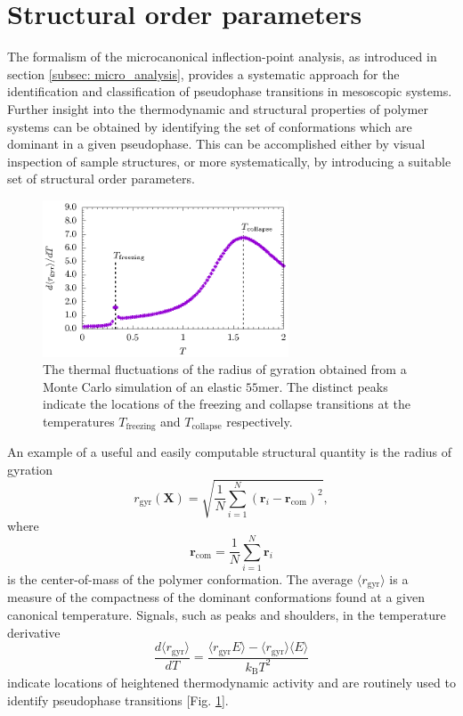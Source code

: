\documentclass[12pt]{report}
\begin{document}
\section{Structural order parameters}
\label{sec:orderParameters}
The formalism of the microcanonical inflection-point analysis, as introduced in section \ref{subsec: micro_analysis}, provides a systematic approach for the identification and classification of pseudophase transitions in mesoscopic systems. Further insight into the thermodynamic and structural properties of polymer systems can be obtained by identifying the set of conformations which are dominant in a given pseudophase. This can be accomplished either by visual inspection of sample structures, or more systematically, by introducing a suitable set of structural order parameters. 
%
\begin{figure}
\center
\includegraphics[width = 0.65\textwidth]{chapter4Figs/rogFluct.eps}
\caption{\label{fig:ROGFluct}%
The thermal fluctuations of the radius of gyration obtained from a Monte Carlo simulation of an elastic $55$mer. The distinct peaks indicate the locations of the freezing and collapse transitions at the temperatures $T_{\mathrm{freezing}}$ and $T_{\mathrm{collapse}}$ respectively.
}
\end{figure}
% 

An example of a useful and easily computable structural quantity is the radius of gyration
%
\begin{equation}
r_\mathrm{gyr}(\mathbf{X})=\sqrt{\frac{1}{N}\sum\limits_{i=1}^N
\left(\mathbf{r}_i-\mathbf{r}_\mathrm{com} \right)^2},
\end{equation}
%
where 
%
\begin{equation}
\mathbf{r}_\mathrm{com}=\frac{1}{N}\sum_{i=1}^N\mathbf{r}_i
\end{equation}
%
is the center-of-mass of the polymer conformation. The average $\langle r_{\mathrm{gyr}} \rangle$ is a measure of the compactness of the dominant conformations found at a given canonical temperature.
\newpage
\noindent
Signals, such as peaks and shoulders, in the temperature derivative 
%
\begin{equation}
\frac{d\langle r_{\mathrm{gyr}} \rangle}{dT} = \frac{\langle r_{\mathrm{gyr}} E \rangle - \langle r_{\mathrm{gyr}} \rangle \langle E \rangle }{k_{\mathrm{B}} T^{2}}
\end{equation} 
%
indicate locations of heightened thermodynamic activity and are routinely used to identify pseudophase transitions [Fig.\,\,\ref{fig:ROGFluct}].
\end{document}
